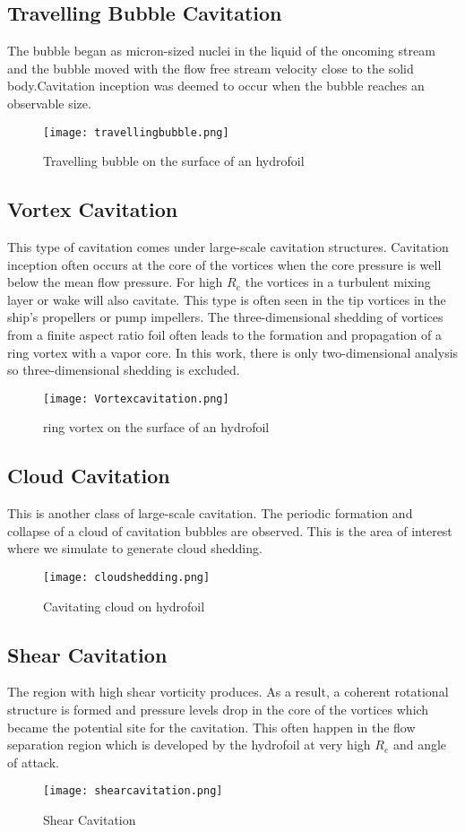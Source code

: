   \subsection{Travelling Bubble Cavitation}
  The bubble began as micron-sized nuclei in the liquid of the oncoming stream and the bubble moved with the flow free stream velocity close to the solid body.Cavitation inception was deemed to occur 
  when the bubble reaches an observable size.
  \begin{figure}[H]
    \centering
    \texttt{[image: travellingbubble.png]}
    \caption{Travelling bubble on the surface of an hydrofoil}
    \label{fig:fig6}
\end{figure}
\subsection{Vortex Cavitation}
  This type of cavitation comes under large-scale cavitation structures. Cavitation inception often occurs at the core of the vortices when the core pressure is well below the mean flow pressure.
For high $R_e$ the vortices in a turbulent mixing layer or wake will also cavitate. This type is often seen in the tip vortices in the ship's propellers or pump impellers.
The three-dimensional shedding of vortices from a finite aspect ratio foil often leads to the formation and propagation 
of a ring vortex with a vapor core. In this work, there is only two-dimensional analysis so three-dimensional shedding is excluded.
\begin{figure}[H]
 \centering
 \texttt{[image: Vortexcavitation.png]}
 \caption{ring vortex on the surface of an hydrofoil}
  \label{fig:fig7}
\end{figure}
\subsection{Cloud Cavitation}
This is another class of large-scale cavitation. The periodic formation and collapse of a cloud of cavitation bubbles are observed. This is the area of interest where we simulate to generate cloud shedding.
 \begin{figure}[H]
 \centering
 \texttt{[image: cloudshedding.png]}
 \caption{Cavitating cloud on hydrofoil}
  \label{fig:fig8}
\end{figure} 
\subsection{Shear Cavitation}
The region with high shear vorticity produces.  As a result, a coherent rotational structure is formed and pressure levels drop in the core of the vortices which became the potential site for the cavitation. This 
often happen in the flow separation region which is developed by the hydrofoil at very high $R_e$ and angle of attack.
\begin{figure}[H]
 \centering
 \texttt{[image: shearcavitation.png]}
 \caption{Shear Cavitation}
  \label{fig:fig9}
\end{figure}
